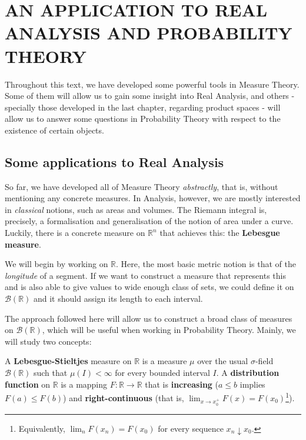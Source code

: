 
\chapter{AN APPLICATION TO REAL ANALYSIS AND PROBABILITY THEORY}\label{chapter:an application to real analysis and probability}

Throughout this text, we have developed some powerful tools in Measure Theory. Some of them will allow us to gain some insight into Real Analysis,
and others - specially those developed in the last chapter, regarding product spaces - will allow us to answer some questions in Probability Theory with respect to the existence of certain objects. 

\section{Some applications to Real Analysis}\label{section:Real Analysis}
So far, we have developed all of Measure Theory \emph{abstractly}, that is, without mentioning any concrete measures. In Analysis, however, we are mostly interested in \emph{classical} notions, such as areas and volumes.
The Riemann integral is, precisely, a formalisation and generalisation of the notion of area under a curve. Luckily, there is a concrete measure on \(\mathbb{R}^{n}\) that achieves this: the \textbf{Lebesgue measure}.

We will begin by working on \(\mathbb{R}\). Here, the most basic metric notion is that of the \emph{longitude} of a segment. If we want to construct a measure that represents this and is also able to give values to wide enough class of sets, we could define it on \(\mathscr{B}\left(\mathbb{R}\right)\) and it should assign its length to each interval. 

The approach followed here will allow us to construct a broad class of measures on \(\mathscr{B}\left(\mathbb{R}\right)\), which will be useful when working in Probability Theory. Mainly, we will study two concepts:

\begin{defn}\label{definition:distribution functions and Lebesgue-Stieltjes measures} A \textbf{Lebesgue-Stieltjes} measure on \(\mathbb{R}\) is a measure
\(\mu\) over the usual \(\sigma\)-field \(\mathscr{B}(\mathbb{R})\) such that
\(\mu(I)<\infty\) for every bounded interval \(I\). A \textbf{distribution
function} on \(\mathbb{R}\) is a mapping \(F\colon\mathbb{R}\to\mathbb{R}\) that is \textbf{increasing}
(\(a\leq b\) implies \(F(a)\leq F(b)\)) and \textbf{right-continuous} (that is,
\(\lim_{x\to x_0^{+}}F(x)=F(x_0)\)\footnote{Equivalently, \(\lim_nF(x_n)=F(x_0)\) for every sequence \(x_n\downarrow x_0\).}).
\end{defn}

